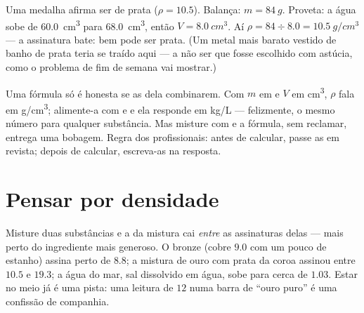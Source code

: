 \begin{example}\label{ex:g7:volume-mass-density:solid}
Uma medalha afirma ser de prata ($\rho = 10.5$). Balança:
$m = \qty{84}{g}$. Proveta: a água sobe de \qty{60.0}{cm^3} para
\qty{68.0}{cm^3}, então $V = \qty{8.0}{cm^3}$. Aí
$\rho = 84 \div 8.0 = \qty{10.5}{g/cm^3}$ --- a assinatura bate: bem
pode ser prata. (Um metal mais barato vestido de banho de prata teria
se traído aqui --- a não ser que fosse escolhido com astúcia, como o
problema de fim de semana vai mostrar.)
\end{example}

\begin{remark}\label{rem:g7:volume-mass-density:units}
Uma fórmula só é honesta se as  dela combinarem. Com $m$ em
 e $V$ em \unit{cm^3}, $\rho$ fala em \unit{g/cm^3}; alimente-a
com  e  e ela responde em \unit{kg/L} --- felizmente,
o mesmo número para qualquer substância. Mas misture  com
 e a fórmula, sem reclamar, entrega uma bobagem. Regra dos
profissionais: antes de calcular, passe as  em revista;
depois de calcular, escreva-as na resposta.
\end{remark}

\section{Pensar por densidade}

\begin{example}\label{ex:g7:volume-mass-density:alloys}
Misture duas substâncias e a  da mistura cai \emph{entre} as
assinaturas delas --- mais perto do ingrediente mais generoso. O
bronze (cobre $9.0$ com um pouco de estanho) assina perto de $8.8$; a
mistura de ouro com prata da coroa assinou entre $10.5$ e $19.3$; a
água do mar, sal dissolvido em água, sobe para cerca de $1.03$. Estar
no meio já é uma pista: uma leitura de $12$ numa barra de ``ouro
puro'' é uma confissão de companhia.
\end{example}

